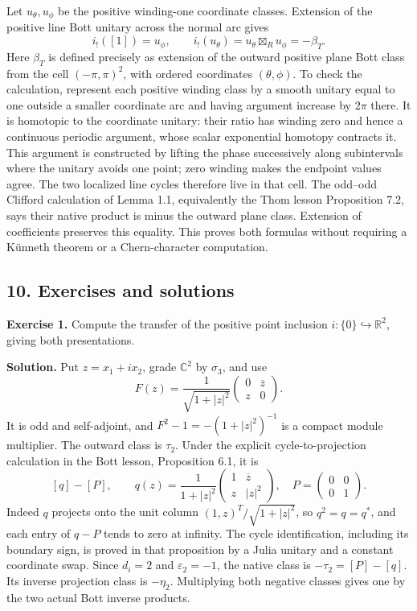 \documentclass[
  11pt,
]{article}
\begin{document}
Let \(u_\theta,u_\phi\) be the positive winding-one coordinate classes.
Extension of the positive line Bott unitary across the normal arc gives
\[
 i_!([1])=u_\phi,\qquad
 i_!(u_\theta)=u_\theta\boxtimes_Ru_\phi=-\beta_T.
 \tag{9.2}
\] Here \(\beta_T\) is defined precisely as extension of the outward
positive plane Bott class from the cell \((-\pi,\pi)^2\), with ordered
coordinates \((\theta,\phi)\). To check the calculation, represent each
positive winding class by a smooth unitary equal to one outside a
smaller coordinate arc and having argument increase by \(2\pi\) there.
It is homotopic to the coordinate unitary: their ratio has winding zero
and hence a continuous periodic argument, whose scalar exponential
homotopy contracts it. This argument is constructed by lifting the phase
successively along subintervals where the unitary avoids one point; zero
winding makes the endpoint values agree. The two localized line cycles
therefore live in that cell. The odd--odd Clifford calculation of Lemma
1.1, equivalently the Thom lesson Proposition 7.2, says their native
product is minus the outward plane class. Extension of coefficients
preserves this equality. This proves both formulas without requiring a
Künneth theorem or a Chern-character computation.

\subsection{10. Exercises and solutions}\label{exercises-and-solutions}

\textbf{Exercise 1.} Compute the transfer of the positive point
inclusion \(i:\{0\}\hookrightarrow\mathbb R^2\), giving both
presentations.

\textbf{Solution.} Put \(z=x_1+ix_2\), grade \(\mathbb C^2\) by
\(\sigma_3\), and use \[
 F(z)=\frac1{\sqrt{1+|z|^2}}
       \begin{pmatrix}0&\overline z\\z&0\end{pmatrix}.
\] It is odd and self-adjoint, and \(F^2-1=-(1+|z|^2)^{-1}\) is a
compact module multiplier. The outward class is \(\tau_2\). Under the
explicit cycle-to-projection calculation in the Bott lesson, Proposition
6.1, it is \[
 [q]-[P],\qquad q(z)=\frac1{1+|z|^2}
 \begin{pmatrix}1&\overline z\\z&|z|^2\end{pmatrix},
 \quad P=\begin{pmatrix}0&0\\0&1\end{pmatrix}.
 \tag{10.1}
\] Indeed \(q\) projects onto the unit column
\((1,z)^T/\sqrt{1+|z|^2}\), so \(q^2=q=q^*\), and each entry of \(q-P\)
tends to zero at infinity. The cycle identification, including its
boundary sign, is proved in that proposition by a Julia unitary and a
constant coordinate swap. Since \(d_i=2\) and \(\varepsilon_2=-1\), the
native class is \(-\tau_2=[P]-[q]\). Its inverse projection class is
\(-\eta_2\). Multiplying both negative classes gives one by the two
actual Bott inverse products.
\end{document}
